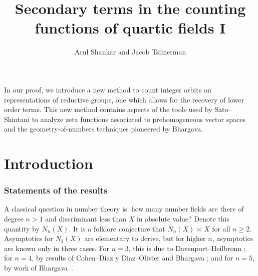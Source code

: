 \documentclass{article}
\title{Secondary terms in the counting functions of quartic fields I}
\author{Arul Shankar and Jacob Tsimerman}
\begin{document}
\maketitle



In our proof, we introduce a new method to count integer orbits on representations of reductive groups, one which allows for the recovery of lower order terms. This new method contains aspects of the tools used by Sato--Shintani to analyze zeta functions associated to prehomogeneous vector spaces and the geometry-of-numbers techniques pioneered by Bhargava.

\tableofcontents

\part{Introduction}

\section{Statements of the results}




A classical question in number theory is: how many number fields are there of degree $n>1$ and discriminant less than $X$ in absolute value? Denote this quantity by $N_n(X)$. It is a folklore conjecture that $N_n(X)\asymp X$ for all $n\geq 2$. Asymptotics for $N_2(X)$ are elementary to derive, but for higher $n$, asymptotics are known only in three cases. For $n=3$, this is due to Davenport--Heilbronn \cite{MR491593}; for $n=4$, by results of Cohen--Diaz y Diaz--Olivier \cite{Cohen_Diaz_Olivier} and Bhargava \cite{dodqf}; and for $n=5$, by work of Bhargava~\cite{dodpf}.
\end{document}

